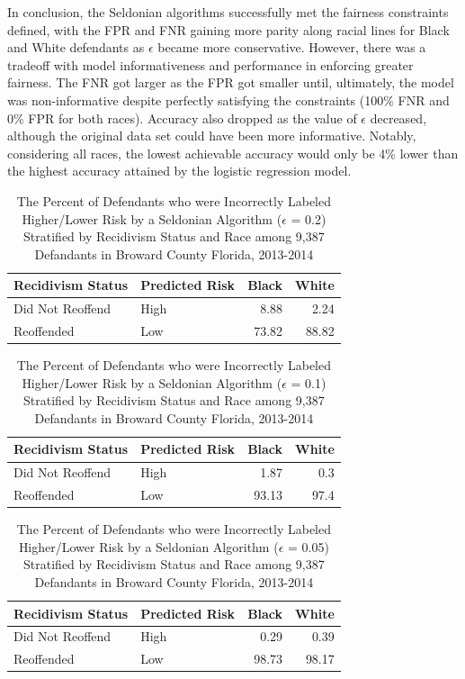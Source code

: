 \documentclass[12pt, twoside]{amherstthesis}
\begin{document}
In conclusion, the Seldonian algorithms successfully met the fairness constraints defined, with the FPR and FNR gaining more parity along racial lines for Black and White defendants as \(\epsilon\) became more conservative. However, there was a tradeoff with model informativeness and performance in enforcing greater fairness. The FNR got larger as the FPR got smaller until, ultimately, the model was non-informative despite perfectly satisfying the constraints (100\% FNR and 0\% FPR for both races). Accuracy also dropped as the value of \(\epsilon\) decreased, although the original data set could have been more informative. Notably, considering all races, the lowest achievable accuracy would only be 4\% lower than the highest accuracy attained by the logistic regression model.
\begin{table}

\caption{\label{tab:ch3table5}The Percent of Defendants who were Incorrectly Labeled Higher/Lower Risk by a Seldonian Algorithm ($\epsilon$ = 0.2) Stratified by Recidivism Status and Race among 9,387 Defandants in Broward County Florida, 2013-2014}
\centering
\begin{tabular}[t]{llrr}
\toprule
Recidivism Status & Predicted Risk & Black & White\\
\midrule
Did Not Reoffend & High & 8.88 & 2.24\\
Reoffended & Low & 73.82 & 88.82\\
\bottomrule
\end{tabular}
\end{table}
\begin{table}

\caption{\label{tab:ch3table6}The Percent of Defendants who were Incorrectly Labeled Higher/Lower Risk by a Seldonian Algorithm ($\epsilon$ = 0.1) Stratified by Recidivism Status and Race among 9,387 Defandants in Broward County Florida, 2013-2014}
\centering
\begin{tabular}[t]{llrr}
\toprule
Recidivism Status & Predicted Risk & Black & White\\
\midrule
Did Not Reoffend & High & 1.87 & 0.3\\
Reoffended & Low & 93.13 & 97.4\\
\bottomrule
\end{tabular}
\end{table}
\begin{table}

\caption{\label{tab:ch3table7}The Percent of Defendants who were Incorrectly Labeled Higher/Lower Risk by a Seldonian Algorithm ($\epsilon$ = 0.05) Stratified by Recidivism Status and Race among 9,387 Defandants in Broward County Florida, 2013-2014}
\centering
\begin{tabular}[t]{llrr}
\toprule
Recidivism Status & Predicted Risk & Black & White\\
\midrule
Did Not Reoffend & High & 0.29 & 0.39\\
Reoffended & Low & 98.73 & 98.17\\
\bottomrule
\end{tabular}
\end{table}
\end{document}
